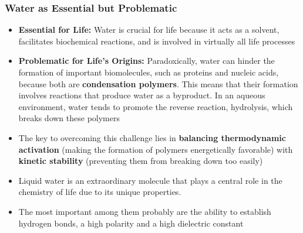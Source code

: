 \documentclass[10pt]{article}
\begin{document}
\subsubsection*{Water as Essential but Problematic}
\begin{itemize}
    \item \textbf{Essential for Life:} Water is crucial for life because it acts as a solvent, facilitates biochemical reactions, and is involved in virtually all life processes
    \item \textbf{Problematic for Life's Origins:} Paradoxically, water can hinder the formation of important biomolecules, such as proteins and nucleic acids, because both are \textbf{condensation polymers}.  This means that their formation involves reactions that produce water as a byproduct.  In an aqueous environment, water tends to promote the reverse reaction, hydrolysis, which breaks down these polymers
    \item The key to overcoming this challenge lies in \textbf{balancing thermodynamic activation} (making the formation of polymers energetically favorable) with \textbf{kinetic stability} (preventing them from breaking down too easily)
\end{itemize}
\begin{center}
\end{center}
\begin{itemize}
    \item Liquid water is an extraordinary molecule that plays a central role in the chemistry of life due to its unique properties.
    \item The most important among them probably are the ability to establish hydrogen bonds, a high polarity and a high dielectric constant
\end{itemize}
\end{document}
